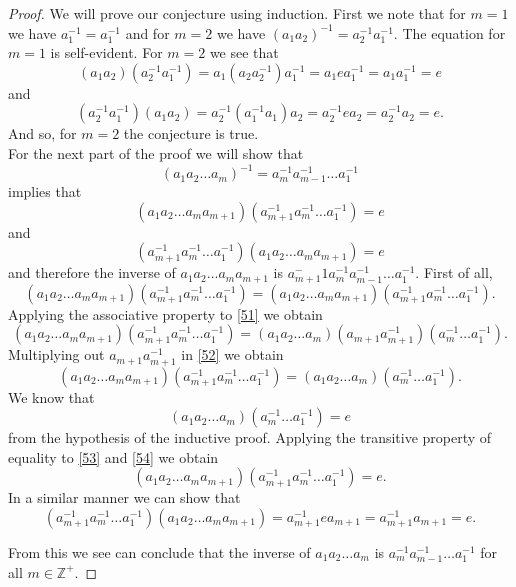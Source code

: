 \documentclass[11pt,a4paper]{article}
\begin{document}
\begin{proof}
We will prove our conjecture using induction. First we note that for $m=1$ we have $a_1^{-1} = a_1^{-1}$ and for $m=2$ we have $(a_1a_2)^{-1} = a_2^{-1}a_1^{-1}$. The equation for $m=1$ is self-evident. For $m=2$ we see that
\[(a_1a_2)(a_2^{-1}a_1^{-1}) = a_1(a_2a_2^{-1})a_1^{-1} = a_1ea_1^{-1} = a_1a_1^{-1} = e\]
and
\[(a_2^{-1}a_1^{-1})(a_1a_2) = a_2^{-1}(a_1^{-1}a_1)a_2 = a_2^{-1}ea_2 = a_2^{-1}a_2 = e.\]
And so, for $m=2$ the conjecture is true.
~\\
For the next part of the proof we will show that
\[(a_1 a_2 \ldots a_m)^{-1} = a_m^{-1}a_{m-1}^{-1}\ldots a_1^{-1} \]
implies that
\[(a_1 a_2 \ldots a_m a_{m+1})(a_{m+1}^{-1} a_m^{-1}\ldots a_1^{-1}) = e\]
and
\[(a_{m+1}^{-1} a_m^{-1}\ldots a_1^{-1})(a_1 a_2 \ldots a_m a_{m+1}) = e\]
and therefore the inverse of  $a_1 a_2 \ldots a_m a_{m+1}$ is $a_{m+1}^-1 a_m^{-1}a_{m-1}^{-1}\ldots a_1^{-1}$. First of all,
\begin{equation}\label{51}
(a_1 a_2 \ldots a_m a_{m+1})(a_{m+1}^{-1} a_m^{-1}\ldots a_1^{-1}) = (a_1 a_2 \ldots a_m a_{m+1})(a_{m+1}^{-1} a_m^{-1}\ldots a_1^{-1}).
\end{equation}
Applying the associative property to \eqref{51} we obtain
\begin{equation}\label{52}
(a_1 a_2 \ldots a_m a_{m+1})(a_{m+1}^{-1} a_m^{-1}\ldots a_1^{-1}) = (a_1 a_2 \ldots a_m) (a_{m+1}a_{m+1}^{-1})( a_m^{-1}\ldots a_1^{-1}).
\end{equation}
Multiplying out $a_{m+1}a_{m+1}^{-1}$ in \eqref{52} we obtain
\begin{equation}\label{53}
(a_1 a_2 \ldots a_m a_{m+1})(a_{m+1}^{-1} a_m^{-1}\ldots a_1^{-1}) = (a_1 a_2 \ldots a_m)( a_m^{-1}\ldots a_1^{-1}).
\end{equation}
We know that
\begin{equation}\label{54}
(a_1 a_2 \ldots a_m)( a_m^{-1}\ldots a_1^{-1}) = e
\end{equation}
from the hypothesis of the inductive proof. Applying the transitive property of equality to \eqref{53} and \eqref{54} we obtain
\begin{equation}
(a_1 a_2 \ldots a_m a_{m+1})(a_{m+1}^{-1} a_m^{-1}\ldots a_1^{-1}) = e.
\end{equation}
In a similar manner we can show that
\[(a_{m+1}^{-1} a_m^{-1}\ldots a_1^{-1})(a_1 a_2 \ldots a_m a_{m+1}) = a_{m+1}^{-1}ea_{m+1} =  a_{m+1}^{-1}a_{m+1} = e. \]

From this we see can conclude that the inverse of $a_1 a_2 \ldots a_m$ is $a_m^{-1}a_{m-1}^{-1}\ldots a_1^{-1}$ for all $m\in\mathbb{Z^+}$.


\end{proof}
\end{document}
